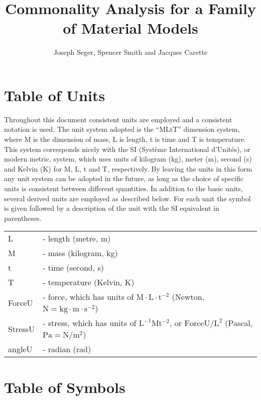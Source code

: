 \documentclass{article}
\title{Commonality Analysis for a Family of Material Models}
\author{Joseph Seger, Spencer Smith and Jacques Carette}
\newcommand{\blt}{- } %
\begin{document}
\maketitle

\tableofcontents

\newpage

\section*{Table of Units}

Throughout this document consistent units are employed and a consistent notation
is used.  The unit system adopted is the ``MLtT'' dimension system, where M is
the dimension of mass, L is length, t is time and T is temperature.  This system
corresponds nicely with the SI (Syst\`{e}me International d'Unit\'{e}s), or
modern metric, system, which uses units of kilogram (kg), meter (m), second (s)
and Kelvin (K) for M, L, t and T, respectively.  By leaving the units in this
form any unit system can be adopted in the future, as long as the choice of
specific units is consistent between different quantities.  In addition to the
basic units, several derived units are employed as described below.  For each
unit the symbol is given followed by a description of the unit with the SI
equivalent in parentheses.  ~\newline

\begin{supertabular}{l p{11cm}}
  L & \blt length (metre, m)\\
  M & \blt mass (kilogram, kg)\\
  t & \blt time (second, s)\\
  T & \blt temperature (Kelvin, K)\\
  ForceU & \blt force, which has units of $\mbox{M} \cdot \mbox{L} \cdot
  \mbox{t}^{-2}$ (Newton, $\mbox{N} = \mbox{kg} \cdot
  \mbox{m} \cdot \mbox{s}^{-2}$)\\
  StressU & \blt stress, which has units of $\mbox{L}^{-1}$M$\mbox{t}^{-2}$, or
  $\mbox{ForceU}/\mbox{L}^2$ (Pascal, $\mbox{Pa} =
  \mbox{N}/\mbox{m}^2$)\\
  angleU & \blt radian (rad)\\
\end{supertabular}

\newpage

\section*{Table of Symbols}
\end{document}
